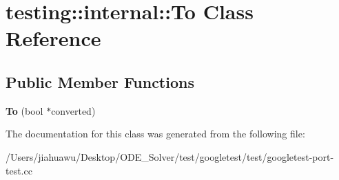 \hypertarget{classtesting_1_1internal_1_1_to}{}\section{testing\+:\+:internal\+:\+:To Class Reference}
\label{classtesting_1_1internal_1_1_to}
\subsection*{Public Member Functions}
\begin{DoxyCompactItemize}
\item 
\mbox{\label{classtesting_1_1internal_1_1_to_a447354e55d855ed0f1a1de8b2b54d345}} 
{\bfseries To} (bool $\ast$converted)
\end{DoxyCompactItemize}


The documentation for this class was generated from the following file\+:\begin{DoxyCompactItemize}
\item 
/\+Users/jiahuawu/\+Desktop/\+O\+D\+E\+\_\+\+Solver/test/googletest/test/googletest-\/port-\/test.\+cc\end{DoxyCompactItemize}

